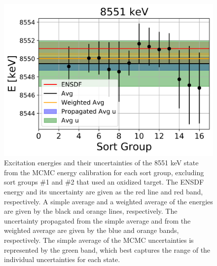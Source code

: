 \begin{figure}[!p]
\centering
\includegraphics[width=6.5in]{Chapter-6/figs/8551keV_comparison.png}
\caption{\label{fig:8551keV_comparison}Excitation energies and their uncertainties of the 8551 keV state from the MCMC energy calibration for each sort group, excluding sort groups $\#$1 and $\#$2 that used an oxidized target. The ENSDF energy and its uncertainty are given as the red line and red band, respectively. A simple average and a weighted average of the energies are given by the black and orange lines, respectively. The uncertainty propagated from the simple average and from the weighted average are given by the blue and orange bands, respectively. The simple average of the MCMC uncertainties is represented by the green band, which best captures the range of the individual uncertainties for each state.}
\end{figure}

